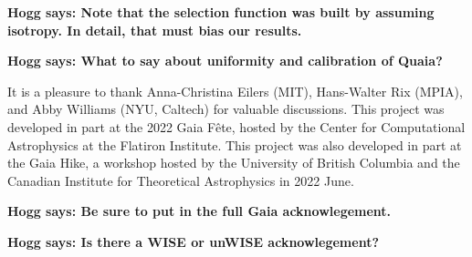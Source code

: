 \documentclass[modern]{aastex631}
\newcommand{\hogg}[1]{\textbf{Hogg says: #1}}
\begin{document}
\hogg{Note that the selection function was built by assuming isotropy. In detail, that must bias our results.}

\hogg{What to say about uniformity and calibration of Quaia?}

\begin{acknowledgements}
It is a pleasure to thank
  Anna-Christina Eilers (MIT),
  Hans-Walter Rix (MPIA), and
  Abby Williams (NYU, Caltech)
for valuable discussions.
This project was developed in part at the 2022 Gaia F\^ete, hosted by the Center for Computational Astrophysics at the Flatiron Institute.
This project was also developed in part at the Gaia Hike, a workshop hosted by the University of British Columbia and the Canadian Institute for Theoretical Astrophysics in 2022 June.

\hogg{Be sure to put in the full Gaia acknowlegement.}

\hogg{Is there a WISE or unWISE acknowlegement?}
\end{acknowledgements}


\end{document}
